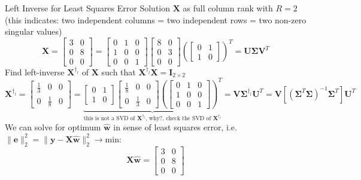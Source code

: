 \documentclass[mathserif, aspectratio=1610]{intbeamer}
\begin{document}
\begin{frame}[t]{Left Inverse for Least Squares Error Solution}
$\bm{X}$ as full column rank with $R=2$  (this indicates:
two independent columns = two independent rows = two non-zero singular values)
$$
\bm{X} =
\begin{bmatrix}
3 & 0 \\ 0 & 8 \\ 0 & 0
\end{bmatrix}
=
\begin{bmatrix}
0 & 1 & 0 \\
1 & 0 & 0 \\
0 & 0 & 1
\end{bmatrix}
%
\begin{bmatrix}
8 & 0\\
0 & 3\\
0 & 0
\end{bmatrix}
%
\left(
\begin{bmatrix}
0 & 1\\
1 & 0
\end{bmatrix}
\right)^T=
\bm{U} \bm{\Sigma} \bm{V}^T
$$
Find left-inverse $\bm{X}^{\dagger_l}$ of $\bm{X}$ such that $\bm{X}^{\dagger_l} \bm{X} = \bm{I}_{2 \times 2}$
%
$$
\bm{X}^{\dagger_l} =
\begin{bmatrix}
\frac{1}{3} & 0 & 0\\ 0 & \frac{1}{8} & 0
\end{bmatrix}
=
\underbrace{
\begin{bmatrix}
0 & 1\\
1 & 0
\end{bmatrix}
%
\begin{bmatrix}
\frac{1}{8} & 0 & 0\\
0 & \frac{1}{3} & 0
\end{bmatrix}
%
\left(
\begin{bmatrix}
0 & 1 & 0 \\
1 & 0 & 0 \\
0 & 0 & 1
\end{bmatrix}
\right)^T}_{\text{this is not a SVD of } \bm{X}^{\dagger_l} \text{, why?, check the SVD of } \bm{X}^{\dagger_l}}
=
\bm{V} \bm{\Sigma}^{\dagger_l} \bm{U}^T =
\bm{V} \left[(\bm{\Sigma}^T \bm{\Sigma})^{-1} \bm{\Sigma}^T\right] \bm{U}^T
$$
%
We can solve for optimum $\hat{\bm{w}}$ in sense of least squares error, i.e. $\lVert \bm{e} \rVert_2^2 = \lVert \bm{y} - \bm{X} \hat{\bm{w}} \rVert_2^2\rightarrow \text{min}$:
$$
\bm{X}\hat{\bm{w}}=
\begin{bmatrix}
3 & 0 \\ 0 & 8 \\ 0 & 0

\end{bmatrix}$$
\end{frame}
\end{document}
